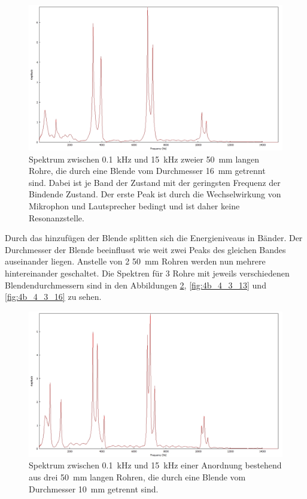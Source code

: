 \begin{figure}
\centering
\includegraphics[width=\textwidth]{content/messungen/Chapter4b/4b_3_10.jpg}
\caption{Spektrum zwischen 0.1~kHz und 15~kHz zweier 50~mm langen Rohre, die durch eine Blende vom Durchmesser 16~mm getrennt sind. Dabei ist je Band der Zustand mit der geringsten Frequenz der Bindende Zustand. Der erste Peak ist durch die Wechselwirkung von Mikrophon und Lautsprecher bedingt und ist daher keine Resonanzstelle.}
\label{fig:4b_3_16}
\end{figure}
Durch das hinzufügen der Blende splitten sich die Energieniveaus in Bänder.
Der Durchmesser der Blende beeinflusst wie weit zwei Peaks des gleichen Bandes auseinander liegen.
Anstelle von 2 50~mm Rohren werden nun mehrere hintereinander geschaltet.
Die Spektren für 3 Rohre mit jeweils verschiedenen Blendendurchmessern sind in den Abbildungen \ref{fig:4b_4_3_10}, \ref{fig:4b_4_3_13} und \ref{fig:4b_4_3_16} zu sehen.
\begin{figure}
\centering
\includegraphics[width=\textwidth]{content/messungen/Chapter4b/4b_4_3_10.jpg}
\caption{Spektrum zwischen 0.1~kHz und 15~kHz einer Anordnung bestehend aus drei 50~mm langen Rohren, die durch eine Blende vom Durchmesser 10~mm getrennt sind.}
\label{fig:4b_4_3_10}
\end{figure}
